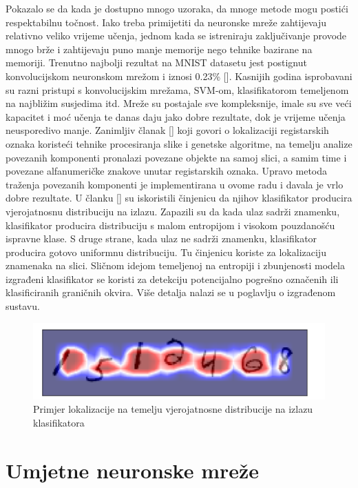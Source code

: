 \documentclass[times, utf8, diplomski]{fer}
\theoremstyle{definition}
\begin{document}
Pokazalo se da kada je dostupno mnogo uzoraka, da mnoge metode mogu postići respektabilnu točnost. Iako treba primijetiti da neuronske mreže zahtijevaju relativno veliko vrijeme učenja, jednom kada se istreniraju zaključivanje provode mnogo brže i zahtijevaju puno manje memorije nego tehnike bazirane na memoriji. Trenutno najbolji rezultat na MNIST datasetu jest postignut konvolucijskom neuronskom mrežom i iznosi 0.23\% [\cite{6248110}]. Kasnijih godina isprobavani su razni pristupi s konvolucijskim mrežama, SVM-om, klasifikatorom temeljenom na najbližim susjedima itd. Mreže su postajale sve kompleksnije, imale su sve veći kapacitet i moć učenja te danas daju jako dobre rezultate, dok je vrijeme učenja neusporedivo manje. Zanimljiv članak [\cite{6490368}] koji govori o lokalizaciji registarskih oznaka koristeći tehnike procesiranja slike i genetske algoritme, na temelju analize povezanih komponenti pronalazi povezane objekte na samoj slici, a samim time i povezane alfanumeričke znakove unutar registarskih oznaka. Upravo metoda traženja povezanih komponenti je implementirana u ovome radu i davala je vrlo dobre rezultate. U članku [\cite{DL2018}] su iskoristili činjenicu da njihov klasifikator producira vjerojatnosnu distribuciju na izlazu. Zapazili su da kada ulaz sadrži znamenku, klasifikator producira distribuciju s malom entropijom i visokom pouzdanošću ispravne klase. S druge strane, kada ulaz ne sadrži znamenku, klasifikator producira gotovo uniformnu distribuciju. Tu činjenicu koriste za lokalizaciju znamenaka na slici. Sličnom idejom temeljenoj na entropiji i zbunjenosti modela izgrađeni klasifikator se koristi za detekciju potencijalno pogrešno označenih ili klasificiranih graničnih okvira. Više detalja nalazi se u poglavlju o izgrađenom sustavu.
\begin{figure}[h]
\centering
\includegraphics[scale=0.6]{localization_entropy.png}
\caption{Primjer lokalizacije na temelju vjerojatnosne distribucije na izlazu klasifikatora}
\end{figure}


\chapter{Umjetne neuronske mreže}
\end{document}
